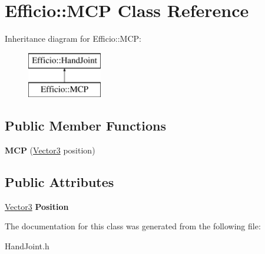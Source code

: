 \hypertarget{class_efficio_1_1_m_c_p}{}\section{Efficio\+:\+:M\+CP Class Reference}
\label{class_efficio_1_1_m_c_p}
Inheritance diagram for Efficio\+:\+:M\+CP\+:\begin{figure}[H]
\begin{center}
\leavevmode
\includegraphics[height=2.000000cm]{class_efficio_1_1_m_c_p}
\end{center}
\end{figure}
\subsection*{Public Member Functions}
\begin{DoxyCompactItemize}
\item 
{\bfseries M\+CP} (\hyperlink{class_efficio_1_1_vector3}{Vector3} position)\hypertarget{class_efficio_1_1_m_c_p_a3dd5a13b65af8dd001f540a1f2865d96}{}\label{class_efficio_1_1_m_c_p_a3dd5a13b65af8dd001f540a1f2865d96}

\end{DoxyCompactItemize}
\subsection*{Public Attributes}
\begin{DoxyCompactItemize}
\item 
\hyperlink{class_efficio_1_1_vector3}{Vector3} {\bfseries Position}\hypertarget{class_efficio_1_1_m_c_p_ad42b3365620505c0aebf885e9cecf8b5}{}\label{class_efficio_1_1_m_c_p_ad42b3365620505c0aebf885e9cecf8b5}

\end{DoxyCompactItemize}


The documentation for this class was generated from the following file\+:\begin{DoxyCompactItemize}
\item 
Hand\+Joint.\+h\end{DoxyCompactItemize}
